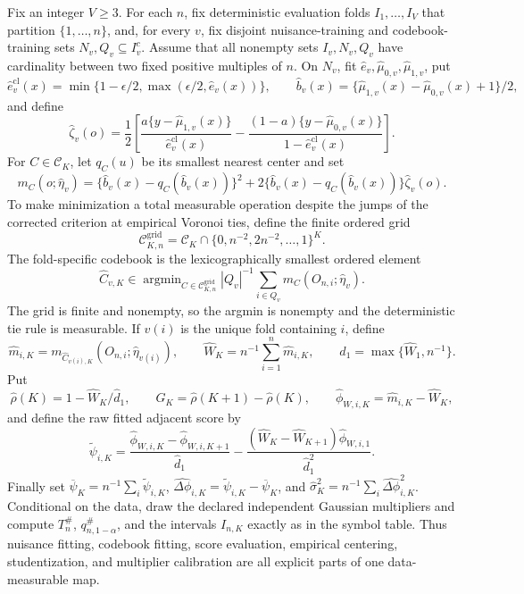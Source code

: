 Fix an integer \(V\geq3\).  For each \(n\), fix deterministic evaluation folds \(I_1,\ldots,I_V\) that partition \(\{1,\ldots,n\}\), and, for every \(v\), fix disjoint nuisance-training and codebook-training sets \(N_v,Q_v\subseteq I_v^c\).  Assume that all nonempty sets \(I_v,N_v,Q_v\) have cardinality between two fixed positive multiples of \(n\).  On \(N_v\), fit \(\widehat e_v,\widehat\mu_{0,v},\widehat\mu_{1,v}\), put
\[
 \widehat e_v^{\mathrm{cl}}(x)=
 \min\{1-\epsilon/2,\max(\epsilon/2,\widehat e_v(x))\},
 \qquad
 \widehat b_v(x)=\{\widehat\mu_{1,v}(x)-\widehat\mu_{0,v}(x)+1\}/2,
\]
and define
\[
 \widehat\zeta_v(o)=\frac12\left[
 \frac{a\{y-\widehat\mu_{1,v}(x)\}}{\widehat e_v^{\mathrm{cl}}(x)}
 -\frac{(1-a)\{y-\widehat\mu_{0,v}(x)\}}{1-\widehat e_v^{\mathrm{cl}}(x)}
 \right].
\]
For \(C\in\mathcal C_K\), let \(q_C(u)\) be its smallest nearest center and set
\[
 m_C(o;\widehat\eta_v)=
 \{\widehat b_v(x)-q_C(\widehat b_v(x))\}^2
 +2\{\widehat b_v(x)-q_C(\widehat b_v(x))\}\widehat\zeta_v(o).
\]
To make minimization a total measurable operation despite the jumps of the corrected criterion at empirical Voronoi ties, define the finite ordered grid
\[
 \mathcal C_{K,n}^{\mathrm{grid}}=
 \mathcal C_K\cap\{0,n^{-2},2n^{-2},\ldots,1\}^K.
\]
The fold-specific codebook is the lexicographically smallest ordered element
\[
 \widehat C_{v,K}\in
 \mathop{\operatorname{argmin}}_{C\in\mathcal C_{K,n}^{\mathrm{grid}}}
 |Q_v|^{-1}\sum_{i\in Q_v}m_C(O_{n,i};\widehat\eta_v).
\]
The grid is finite and nonempty, so the argmin is nonempty and the deterministic tie rule is measurable.  If \(v(i)\) is the unique fold containing \(i\), define
\[
 \widehat m_{i,K}=m_{\widehat C_{v(i),K}}(O_{n,i};\widehat\eta_{v(i)}),
 \qquad
 \widehat W_K=n^{-1}\sum_{i=1}^n\widehat m_{i,K},
 \qquad
 \widehat d_1=\max\{\widehat W_1,n^{-1}\}.
\]
Put
\[
 \widehat\rho(K)=1-\widehat W_K/\widehat d_1,
 \qquad
 \widehat G_K=\widehat\rho(K+1)-\widehat\rho(K),
 \qquad
 \widehat\phi_{W,i,K}=\widehat m_{i,K}-\widehat W_K,
\]
and define the raw fitted adjacent score by
\[
 \widetilde\psi_{i,K}=
 \frac{\widehat\phi_{W,i,K}-\widehat\phi_{W,i,K+1}}{\widehat d_1}
 -\frac{(\widehat W_K-\widehat W_{K+1})\widehat\phi_{W,i,1}}
 {\widehat d_1^2}.
\]
Finally set \(\overline\psi_K=n^{-1}\sum_i\widetilde\psi_{i,K}\), \(\widehat{\Delta\phi}_{i,K}=\widetilde\psi_{i,K}-\overline\psi_K\), and \(\widehat\sigma_K^2=n^{-1}\sum_i\widehat{\Delta\phi}_{i,K}^2\).  Conditional on the data, draw the declared independent Gaussian multipliers and compute \(T_n^{\#}\), \(q_{n,1-\alpha}^{\#}\), and the intervals \(I_{n,K}\) exactly as in the symbol table.  Thus nuisance fitting, codebook fitting, score evaluation, empirical centering, studentization, and multiplier calibration are all explicit parts of one data-measurable map.